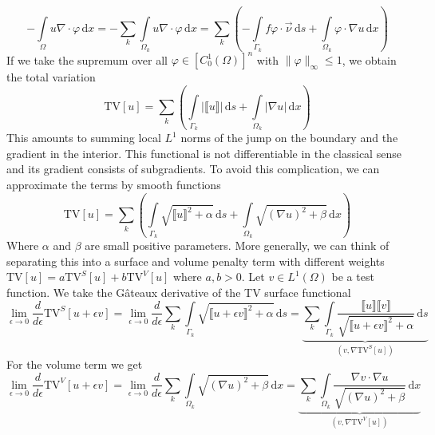 \documentclass[a4paper,12pt]{article}
\begin{document}
\begin{equation}
-\int\limits_\Omega u\nabla\cdot\varphi\,\mathrm{d}x =
-\sum\limits_k \int\limits_{\Omega_k}u\nabla\cdot\varphi\,\mathrm{d}x
=\sum\limits_k \left(
-\int\limits_{\Gamma_k} f\varphi\cdot\vec\nu\,\mathrm{d}s + \int\limits_{\Omega_k}\varphi\cdot\nabla u\,\mathrm{d}x
\right)
\end{equation}
If we take the supremum over all $\varphi\in[C_0^1(\Omega)]^n$ with $\|\varphi\|_\infty\leq 1$, we obtain the total 
variation
\begin{equation}
\text{TV}[u] = \sum\limits_k\left(\int\limits_{\Gamma_k} |\llbracket u\rrbracket|\,\mathrm{d}s
+\int\limits_{\Omega_k} |\nabla u|\,\mathrm{d}x\right)
\end{equation}
This amounts to summing local $L^1$ norms of the jump on the boundary and the gradient in the interior. This functional
is not differentiable in the classical sense and its gradient consists of subgradients. To avoid this complication,
we can approximate the terms by smooth functions
\begin{equation}
\text{TV}[u] =  \sum\limits_k\left(\int\limits_{\Gamma_k} \sqrt{\llbracket u\rrbracket^2+\alpha} \,\mathrm{d}s
+\int\limits_{\Omega_k} \sqrt{(\nabla u)^2 +\beta }\,\mathrm{d}x\right)
\end{equation}
Where $\alpha$ and $\beta$ are small positive parameters. More generally, we can think of separating this into a surface
and volume penalty term with different weights $\text{TV}[u]=a \text{TV}^S[u] + b \text{TV}^V[u]$ where $a,b>0$.
Let $v\in L^1(\Omega)$ be a test function. We take the 
G\^ateaux derivative of the TV surface functional
\begin{equation}
\lim_{\epsilon\rightarrow 0}\frac{d}{d\epsilon}\text{TV}^S[u+\epsilon v] = 
\lim_{\epsilon\rightarrow 0}\frac{d}{d\epsilon}
\sum\limits_k\int\limits_{\Gamma_k} \sqrt{\llbracket u+\epsilon v\rrbracket^2+\alpha} \,\mathrm{d}s
=
\underbrace{\sum\limits_k\int\limits_{\Gamma_k} \frac{\llbracket u\rrbracket \llbracket v \rrbracket}
{\sqrt{\llbracket u+\epsilon v\rrbracket^2+\alpha}} \,\mathrm{d}s}_{(v,\nabla\text{TV}^S[u])}
\end{equation}
For the volume term we get
\begin{equation}
\lim_{\epsilon\rightarrow 0}\frac{d}{d\epsilon}\text{TV}^V[u+\epsilon v] = 
\lim_{\epsilon\rightarrow 0}\frac{d}{d\epsilon}
\sum\limits_k\int\limits_{\Omega_k} \sqrt{(\nabla u)^2+\beta } \,\mathrm{d}x
=
\underbrace{\sum\limits_k\int\limits_{\Omega_k} \frac{\nabla v\cdot \nabla u}{\sqrt{(\nabla u)^2+\beta }} \,\mathrm{d}x}_{
(v,\nabla\text{TV}^V[u])}
\end{equation}
\end{document}

